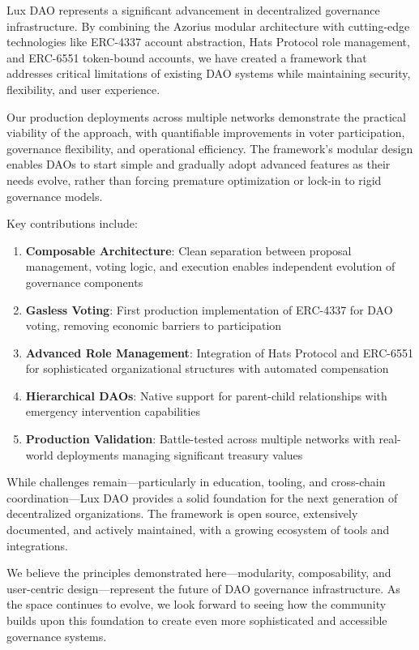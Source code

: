 \documentclass[11pt,a4paper]{article}
\begin{document}
Lux DAO represents a significant advancement in decentralized governance infrastructure. By combining the Azorius modular architecture with cutting-edge technologies like ERC-4337 account abstraction, Hats Protocol role management, and ERC-6551 token-bound accounts, we have created a framework that addresses critical limitations of existing DAO systems while maintaining security, flexibility, and user experience.

Our production deployments across multiple networks demonstrate the practical viability of the approach, with quantifiable improvements in voter participation, governance flexibility, and operational efficiency. The framework's modular design enables DAOs to start simple and gradually adopt advanced features as their needs evolve, rather than forcing premature optimization or lock-in to rigid governance models.

Key contributions include:

\begin{enumerate}
    \item \textbf{Composable Architecture}: Clean separation between proposal management, voting logic, and execution enables independent evolution of governance components
    \item \textbf{Gasless Voting}: First production implementation of ERC-4337 for DAO voting, removing economic barriers to participation
    \item \textbf{Advanced Role Management}: Integration of Hats Protocol and ERC-6551 for sophisticated organizational structures with automated compensation
    \item \textbf{Hierarchical DAOs}: Native support for parent-child relationships with emergency intervention capabilities
    \item \textbf{Production Validation}: Battle-tested across multiple networks with real-world deployments managing significant treasury values
\end{enumerate}

While challenges remain—particularly in education, tooling, and cross-chain coordination—Lux DAO provides a solid foundation for the next generation of decentralized organizations. The framework is open source, extensively documented, and actively maintained, with a growing ecosystem of tools and integrations.

We believe the principles demonstrated here—modularity, composability, and user-centric design—represent the future of DAO governance infrastructure. As the space continues to evolve, we look forward to seeing how the community builds upon this foundation to create even more sophisticated and accessible governance systems.
\end{document}
